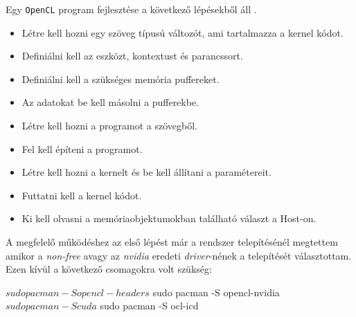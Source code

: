 
Egy \texttt{OpenCL} program fejlesztése a következő lépésekből áll \cite{opencl}.
\begin{itemize}
\item Létre kell hozni egy szöveg típusú változót, ami tartalmazza a kernel kódot.
\item Definiálni kell az eszközt, kontextust és parancssort.
\item Definiálni kell a szükséges memória puffereket.
\item Az adatokat be kell másolni a pufferekbe.
\item Létre kell hozni a programot a szövegből.
\item Fel kell építeni a programot.
\item Létre kell hozni a kernelt és be kell állítani a paramétereit.
\item Futtatni kell a kernel kódot.
\item Ki kell olvasni a memóriaobjektumokban található választ a Host-on.
\end{itemize}


A megfelelő működéshez az első lépést már a rendszer telepítésénél megtettem amikor a \textit{non-free} avagy az \textit{nvidia} eredeti \textit{driver}-nének a telepítését választottam.
Ezen kívül a következő csomagokra volt szükség: 

\begin{python}
$ sudo pacman -S opencl-headers
$ sudo pacman -S opencl-nvidia
$ sudo pacman -S cuda
$ sudo pacman -S ocl-icd
\end{python}
